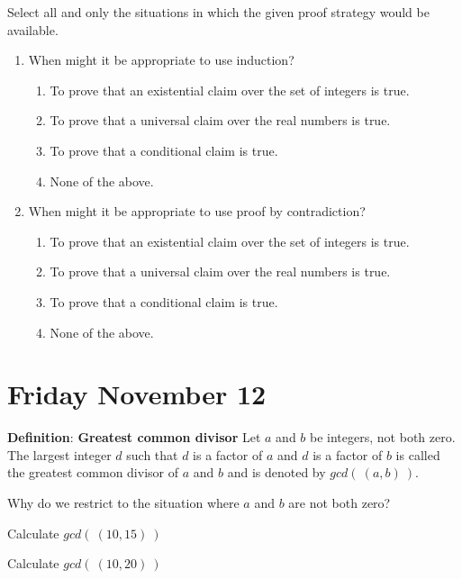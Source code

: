 \documentclass[12pt, oneside]{article}
\begin{document}
\begin{enumerate}
Select all and only the situations in which the given
proof strategy would be available.

\begin{enumerate}
\item When might it be appropriate to use induction?
    \begin{enumerate}
        \item To prove that an existential claim over the set of integers is true.
        \item To prove that a universal claim over the real numbers is true.
        \item To prove that a conditional claim is true.
        \item None of the above.
    \end{enumerate}
\item When might it be appropriate to use proof by contradiction?
    \begin{enumerate}
        \item To prove that an existential claim over the set of integers is true.
        \item To prove that a universal claim over the real numbers is true.
        \item To prove that a conditional claim is true.
        \item None of the above.
    \end{enumerate}
\end{enumerate}
 \end{enumerate}

\newpage
\section*{Friday November 12}



{\bf Definition}: {\bf Greatest common divisor} Let $a$ and $b$ be integers, not both zero. The largest integer $d$ such that 
$d$ is a  factor of $a$ and $d$ is a factor of  $b$ is called the greatest common divisor of $a$ and $b$ 
and is denoted by $gcd(~(a, b)~)$. 

Why do we restrict to the situation where $a$ and $b$ are not both zero?

\vspace{50pt}


Calculate $gcd(~(10,15)~)$

\vspace{50pt}

Calculate $gcd(~(10,20)~)$
\end{document}
